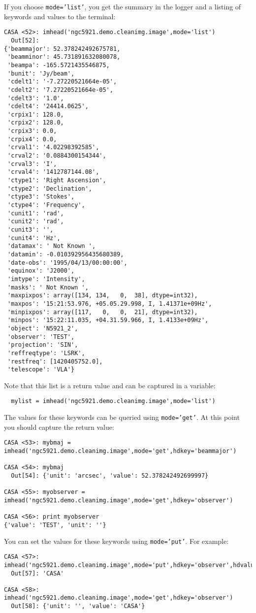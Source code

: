 If you choose {\tt mode='list'}, you get the summary in the logger and
a listing of keywords and values to the terminal:
\small
\begin{verbatim}
CASA <52>: imhead('ngc5921.demo.cleanimg.image',mode='list')
  Out[52]: 
{'beammajor': 52.378242492675781,
 'beamminor': 45.731891632080078,
 'beampa': -165.5721435546875,
 'bunit': 'Jy/beam',
 'cdelt1': '-7.27220521664e-05',
 'cdelt2': '7.27220521664e-05',
 'cdelt3': '1.0',
 'cdelt4': '24414.0625',
 'crpix1': 128.0,
 'crpix2': 128.0,
 'crpix3': 0.0,
 'crpix4': 0.0,
 'crval1': '4.02298392585',
 'crval2': '0.0884300154344',
 'crval3': 'I',
 'crval4': '1412787144.08',
 'ctype1': 'Right Ascension',
 'ctype2': 'Declination',
 'ctype3': 'Stokes',
 'ctype4': 'Frequency',
 'cunit1': 'rad',
 'cunit2': 'rad',
 'cunit3': '',
 'cunit4': 'Hz',
 'datamax': ' Not Known ',
 'datamin': -0.010392956435680389,
 'date-obs': '1995/04/13/00:00:00',
 'equinox': 'J2000',
 'imtype': 'Intensity',
 'masks': ' Not Known ',
 'maxpixpos': array([134, 134,   0,  38], dtype=int32),
 'maxpos': '15:21:53.976, +05.05.29.998, I, 1.41371e+09Hz',
 'minpixpos': array([117,   0,   0,  21], dtype=int32),
 'minpos': '15:22:11.035, +04.31.59.966, I, 1.4133e+09Hz',
 'object': 'N5921_2',
 'observer': 'TEST',
 'projection': 'SIN',
 'reffreqtype': 'LSRK',
 'restfreq': [1420405752.0],
 'telescope': 'VLA'}
\end{verbatim}
\normalsize
Note that this list is a return value and can be captured in a
variable:
\small
\begin{verbatim}
  mylist = imhead('ngc5921.demo.cleanimg.image',mode='list')
\end{verbatim}
\normalsize

The values for these keywords can be queried using {\tt mode='get'}.
At this point you should capture the return value:
\small
\begin{verbatim}
CASA <53>: mybmaj = imhead('ngc5921.demo.cleanimg.image',mode='get',hdkey='beammajor')

CASA <54>: mybmaj
  Out[54]: {'unit': 'arcsec', 'value': 52.378242492699997}

CASA <55>: myobserver = imhead('ngc5921.demo.cleanimg.image',mode='get',hdkey='observer')

CASA <56>: print myobserver
{'value': 'TEST', 'unit': ''}
\end{verbatim}
\normalsize

You can set the values for these keywords using
{\tt mode='put'}.  For example:
\small
\begin{verbatim}
CASA <57>: imhead('ngc5921.demo.cleanimg.image',mode='put',hdkey='observer',hdvalue='CASA')
  Out[57]: 'CASA'

CASA <58>: imhead('ngc5921.demo.cleanimg.image',mode='get',hdkey='observer')
  Out[58]: {'unit': '', 'value': 'CASA'}
\end{verbatim}
\normalsize

